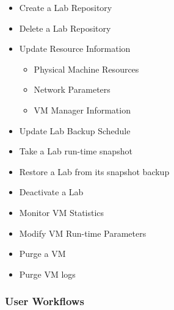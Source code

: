 \documentclass[11pt]{article}
\begin{document}
\begin{itemize}

\item Create a Lab Repository\\
\label{sec-3.5.2.1}


\item Delete a Lab Repository\\
\label{sec-3.5.2.2}


\item Update Resource Information\\
\label{sec-3.5.2.3}

\begin{itemize}
\item Physical Machine Resources
\item Network Parameters
\item VM Manager Information
\end{itemize}

\item Update Lab Backup Schedule\\
\label{sec-3.5.2.4}


\item Take a Lab run-time snapshot\\
\label{sec-3.5.2.5}


\item Restore a Lab from its snapshot backup\\
\label{sec-3.5.2.6}


\item Deactivate a Lab\\
\label{sec-3.5.2.7}


\item Monitor VM Statistics\\
\label{sec-3.5.2.8}


\item Modify VM Run-time Parameters\\
\label{sec-3.5.2.9}


\item Purge a VM\\
\label{sec-3.5.2.10}


\item Purge VM logs\\
\label{sec-3.5.2.11}

\end{itemize} %
\subsubsection{User Workflows}
\label{sec-3.5.3}
\end{document}
